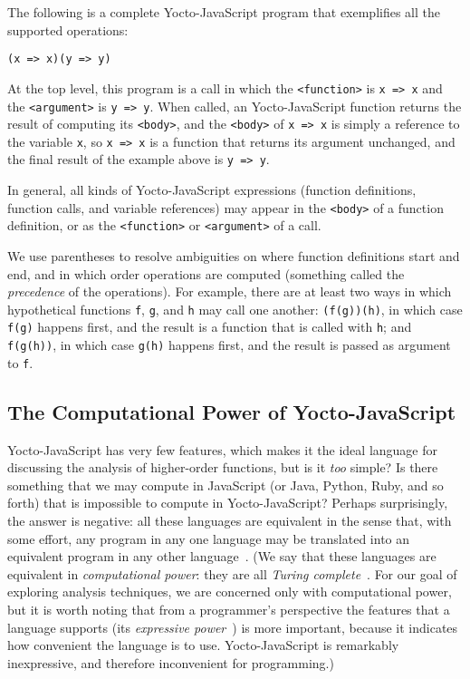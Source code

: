 \documentclass[12pt, oneside]{book}
\begin{document}
The following is a complete Yocto-JavaScript program that exemplifies all the supported operations:

\begin{verbatim}
(x => x)(y => y)
\end{verbatim}

At the top level, this program is a call in which the \verb!<function>! is \texttt{x => x} and the \verb!<argument>! is \texttt{y => y}. When called, an Yocto-JavaScript function returns the result of computing its \verb!<body>!, and the \verb!<body>! of \texttt{x => x} is simply a reference to the variable \texttt{x}, so \texttt{x => x} is a function that returns its argument unchanged, and the final result of the example above is \texttt{y => y}.

In general, all kinds of Yocto-JavaScript expressions (function definitions, function calls, and variable references) may appear in the \verb!<body>! of a function definition, or as the \verb!<function>! or \verb!<argument>! of a call.

We use parentheses to resolve ambiguities on where function definitions start and end, and in which order operations are computed (something called the \emph{precedence} of the operations). For example, there are at least two ways in which hypothetical functions \texttt{f}, \texttt{g}, and \texttt{h} may call one another: \texttt{(f(g))(h)}, in which case \texttt{f(g)} happens first, and the result is a function that is called with \texttt{h}; and \texttt{f(g(h))}, in which case \texttt{g(h)} happens first, and the result is passed as argument to \texttt{f}.

\subsection{The Computational Power of Yocto-JavaScript}

Yocto-JavaScript has very few features, which makes it the ideal language for discussing the analysis of higher-order functions, but is it \emph{too} simple? Is there something that we may compute in JavaScript (or Java, Python, Ruby, and so forth) that is impossible to compute in Yocto-JavaScript? Perhaps surprisingly, the answer is negative: all these languages are equivalent in the sense that, with some effort, any program in any one language may be translated into an equivalent program in any other language~\cite[§~6]{understanding-computation}. (We say that these languages are equivalent in \emph{computational power}: they are all \emph{Turing complete}~\cite[§~7]{understanding-computation}. For our goal of exploring analysis techniques, we are concerned only with computational power, but it is worth noting that from a programmer’s perspective the features that a language supports (its \emph{expressive power}~\cite{expressive-power}) is more important, because it indicates how convenient the language is to use. Yocto-JavaScript is remarkably inexpressive, and therefore inconvenient for programming.)
\end{document}
